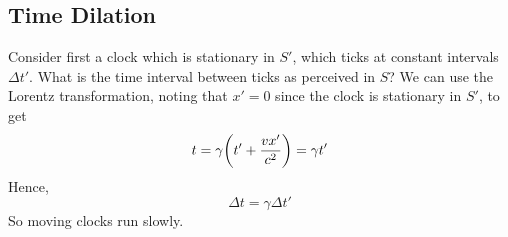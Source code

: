 \subsection{Time Dilation}
Consider first a clock which is stationary in \(S'\), which ticks at constant intervals \(\Delta t'\).
What is the time interval between ticks as perceived in \(S\)? We can use the Lorentz transformation, noting that \(x'=0\) since the clock is stationary in \(S'\), to get
\[
	t = \gamma\qty(t' + \frac{vx'}{c^2}) = \gamma t'
\]
Hence,
\[
	\Delta t = \gamma \Delta t'
\]
So moving clocks run slowly.
